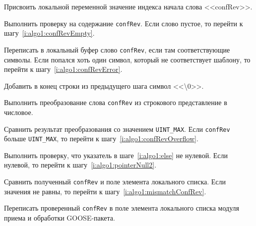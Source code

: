 \begin{enumerate_step}
    \item Присвоить локальной переменной значение индекса начала слова <<confRev>>.
    \item Выполнить проверку на содержание \lstinline{confRev}. Если слово пустое, то перейти к шагу~\ref{i:algo1:confRevEmpty}.
    \item Переписать в локальный буфер слово \lstinline{confRev}, если там соответствующие символы. Если попался хоть один символ, который не соответствует шаблону, то перейти к шагу~\ref{i:algo1:confRevError}.
    \item Добавить в конец строки из предыдущего шага символ <<\textbackslash 0>>.
    \item Выполнить преобразование слова \lstinline{confRev} из строкового представление в числовое.
    \item Сравнить результат преобразования со значением \lstinline{UINT_MAX}. Если \lstinline{confRev} больше \lstinline{UINT_MAX}, то перейти к шагу~\ref{i:algo1:confRevOverflow}.
    \item Выполнить проверку, что указатель в шаге~\ref{i:algo1:else} не нулевой. Если нулевой, то перейти к шагу~\ref{i:algo1:pointerNull2}.
    \item Сравнить полученный \lstinline{confRev} и поле элемента локального списка. Если значения не равны, то перейти к шагу~\ref{i:algo1:mismatchConfRev}.
    \item \label{i:algo1:pointerNull2} Переписать проверенный \lstinline{confRev} в поле элемента локального списка модуля приема и обработки GOOSE-пакета.


\end{enumerate_step}
